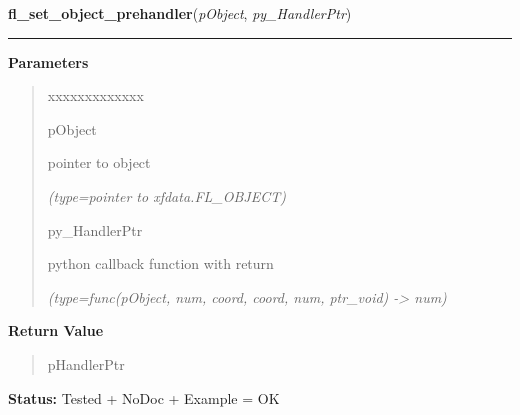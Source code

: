 \hspace{.8\funcindent}\begin{boxedminipage}{\funcwidth}

    \raggedright \textbf{fl\_set\_object\_prehandler}(\textit{pObject}, \textit{py\_HandlerPtr})

    \vspace{-1.5ex}

    \rule{\textwidth}{0.5\fboxrule}
\setlength{\parskip}{2ex}
\setlength{\parskip}{1ex}
      \textbf{Parameters}
      \vspace{-1ex}

      \begin{quote}
        \begin{Ventry}{xxxxxxxxxxxxx}

          \item[pObject]

          pointer to object

            {\it (type=pointer to xfdata.FL\_OBJECT)}

          \item[py\_HandlerPtr]

          python callback function with return

            {\it (type=func(pObject, num, coord, coord, num, ptr\_void) -{\textgreater} num)}

        \end{Ventry}

      \end{quote}

      \textbf{Return Value}
    \vspace{-1ex}

      \begin{quote}
      pHandlerPtr

      \end{quote}

\textbf{Status:} Tested + NoDoc + Example = OK



    \end{boxedminipage}

    \label{xformslib:library:fl_set_object_posthandler}

    \vspace{0.5ex}

